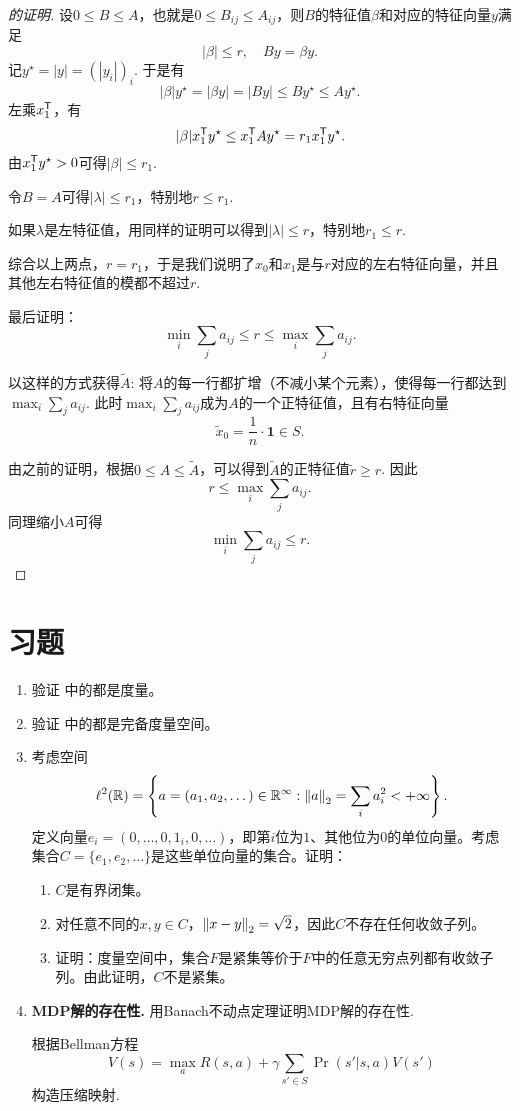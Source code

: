 \begin{proof}[ 的证明]
设$0\leq B\leq A$，也就是$0\leq B_{ij}\leq A_{ij}$，则$B$的特征值$\beta$和对应的特征向量$y$满足
\[|\beta|\leq r,\quad By=\beta y.\]
记$y^\star = |y|=(|y_i|)_i$. 于是有
\[|\beta|y^\star = |\beta y| = |By| \leq By^\star\leq Ay^\star.\]
左乘$x_1^{\mathsf{T}}$，有
\[|\beta|x_1^{\mathsf{T}} y^\star \leq x_1^{\mathsf{T}} Ay^\star = r_1x_1^{\mathsf{T}} y^\star.\]
由$x_1^{\mathsf{T}} y^\star>0$可得$|\beta|\leq r_1$. 

令$B=A$可得$|\lambda|\leq r_1$，特别地$r\leq r_1$. 

如果$\lambda$是左特征值，用同样的证明可以得到$|\lambda|\leq r$，特别地$r_1\leq r$. 

综合以上两点，$r=r_1$，于是我们说明了$x_0$和$x_1$是与$r$对应的左右特征向量，并且其他左右特征值的模都不超过$r$. 

最后证明：
\[\min_i\sum_j a_{ij}\leq r\leq \max_i\sum_j a_{ij}.\]

以这样的方式获得$\tilde A$: 将$A$的每一行都扩增（不减小某个元素），使得每一行都达到$\max_i\sum_j a_{ij}$. 此时$\max_i\sum_j a_{ij}$成为$A$的一个正特征值，且有右特征向量
\[\tilde{x}_0=\frac 1n\cdot\mathbf{1}\in S.\] 

由之前的证明，根据$0\leq A\leq \tilde A$，可以得到$\tilde A$的正特征值$\tilde r\geq r$. 因此
\[r \leq \max_i\sum_j a_{ij}.\]
同理缩小$A$可得
\[\min_i\sum_j a_{ij}\leq r.\]
\end{proof}


\section{习题}

\begin{enumerate}[wide, labelindent=0pt]
    \item \label{exercise:metric} 验证 中的都是度量。
    \item \label{exercise:complete-metric-space} 验证 中的都是完备度量空间。
    \item \label{exercise:compact-not-bounded-closed} 考虑空间
    \[\ell^2(\mathbb{R})=\left\{a=(a_1,a_2,\dots)\in\mathbb{R}^{\infty}:\left\|a\right\|_2=\sum_{i}a_i^2<+\infty\right\}.\]
    定义向量$e_i=(0,\dots,0,1_i,0,\dots)$，即第$i$位为$1$、其他位为$0$的单位向量。考虑集合$C=\{e_1,e_2,\dots\}$是这些单位向量的集合。证明：
    \begin{enumerate}
        \item $C$是有界闭集。
        \item 对任意不同的$x,y\in C$，$\left\|x-y\right\|_2=\sqrt{2}$，因此$C$不存在任何收敛子列。
        \item 证明：度量空间中，集合$F$是紧集等价于$F$中的任意无穷点列都有收敛子列。由此证明，$C$不是紧集。
    \end{enumerate}

    \item \textbf{MDP解的存在性.} 用Banach不动点定理证明MDP解的存在性.
    \begin{hint}
    根据Bellman方程
    \[
    V(s) = \max_a R(s, a) + \gamma \sum_{s' \in S} \Pr(s' | s, a) V(s')
    \]
    构造压缩映射.
    \end{hint}

\end{enumerate}
